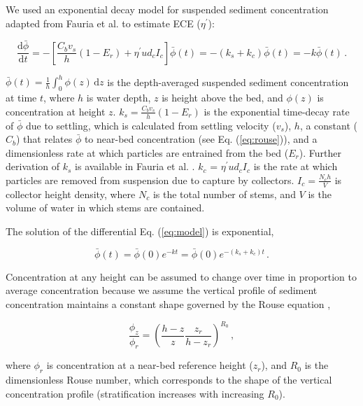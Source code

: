 \documentclass[geosciences,article,submit,moreauthors,pdftex]{Definitions/mdpi}
\begin{document}
We used an exponential decay model for suspended sediment concentration adapted from Fauria et al. \cite{Fauria_2015} to estimate ECE ($\eta^\prime$):

\begin{equation}
    \frac{\mathrm{d}\bar{\phi}}{\mathrm{d}t} = -\left[\frac{C_bv_s}{h}(1-E_r) + \eta^{\prime}ud_cI_c\right]\bar{\phi}(t) = -(k_s + k_c)\bar{\phi}(t) = -k\bar{\phi}(t)\,.
    \label{eq:model}    
\end{equation}

\noindent $\bar{\phi}(t) = \frac{1}{h} \int_0^h\phi(z) \,\mathrm{d}z$ is the depth-averaged suspended sediment concentration at time $t$, where $h$ is water depth, $z$ is height above the bed, and $\phi(z)$ is concentration at height $z$. $k_s = \frac{C_bv_s}{h}(1-E_r)$ is the exponential time-decay rate of $\bar{\phi}$ due to settling, which is calculated from settling velocity ($v_s$), $h$, a constant ($C_b$) that relates $\bar{\phi}$ to near-bed concentration (see Eq. (\ref{eq:rouse})), and a dimensionless rate at which particles are entrained from the bed ($E_r$). Further derivation of $k_s$ is available in Fauria et al. \cite{Fauria_2015}. $k_c$ = $\eta^{\prime}ud_cI_c$ is the rate at which particles are removed from suspension due to capture by collectors. $I_c = \frac{N_ch}{V}$ is collector height density, where $N_c$ is the total number of stems, and $V$ is the volume of water in which stems are contained.

The solution of the differential Eq. (\ref{eq:model}) is exponential,

\begin{equation}
    \bar{\phi}(t) = \bar{\phi}(0)e^{-kt} = \bar{\phi}(0)e^{-(k_s + k_c)t}\,.
    \label{eq:expo}    
\end{equation}

\noindent Concentration at any height can be assumed to change over time in proportion to average concentration because we assume the vertical profile of sediment concentration maintains a constant shape governed by the Rouse equation \cite{rouse1937modern, kumbhakar2017derivation},

\begin{equation}
    \frac{\phi_z}{\phi_r} = \left( \frac{h - z}{z} \frac{z_r}{h - z_r} \right)^{R_0}\,,
    \label{eq:rouse}    
\end{equation}

\noindent where $\phi_r$ is concentration at a near-bed reference height ($z_r$), and $R_0$ is the dimensionless Rouse number, which corresponds to the shape of the vertical concentration profile (stratification increases with increasing $R_0$).
\end{document}
